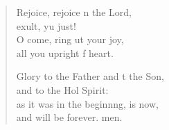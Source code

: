 \begin{verse}
\begin{patverse}
Rejoice, rejoice \pointup{\i}n the Lord,\Med\\
exult, yu just!\\
O come, ring ut your joy,\Med\\
all you upright f heart.

Glory to the Father and t the Son,\Med\\
and to the Hol Spirit:\\
as it was in the beginn\pointup{\i}ng, is now,\Med\\
and will be forever. men. 
  \end{patverse}
\end{verse}

